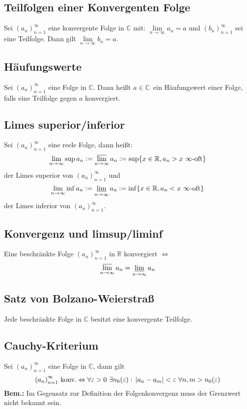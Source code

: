 \documentclass[10pt]{article}
\newcommand{\R}{\mathbb{R}}
\newcommand{\C}{\mathbb{C}}
\newcommand{\an}{{(a_n)}_{n=1}^\infty}
\begin{document}
    \subsection{Teilfolgen einer Konvergenten Folge}
    Sei $\an$ eine konvergente Folge in $\C$ mit:
    $\lim\limits_{n \rightarrow \infty} a_n = a$ und ${(b_n)}_{n=1}^\infty$
    sei eine Teilfolge. Dann gilt $\lim\limits_{n \rightarrow \infty} b_n = a$.

    \subsection{Häufungswerte} Sei $\an$ eine Folge in $\C$. Dann heißt
    $a \in\C$\ ein Häufungswert einer Folge, falls eine Teilfolge gegen $a$ konvergiert.

    \subsection{Limes superior/inferior}
    Sei $\an$ eine reele Folge, dann heißt:
    \begin{equation*}
        \lim_{n \rightarrow \infty} \sup a_n :=
        \varlimsup_{n \rightarrow \infty} a_n :=
        \sup \{ x \in \R, a_n > x\ \infty\text{-oft}\}
    \end{equation*}
    der Limes superior von $\an$ und
    \begin{equation*}
        \lim_{n \rightarrow \infty} \inf a_n :=
        \varliminf_{n \rightarrow \infty} a_n :=
        \inf \{ x \in \R, a_n < x\ \infty\text{-oft}\}
    \end{equation*}
    der Limes inferior von $\an$.

    \subsection{Konvergenz und limsup/liminf}
    Eine beschränkte Folge $\an$ in $\R$ konvergiert $\Leftrightarrow$
    \begin{equation*}
         \varlimsup_{n \rightarrow \infty} a_n
        = \varliminf_{n \rightarrow \infty} a_n
    \end{equation*}

    \subsection{Satz von Bolzano-Weierstraß}
    Jede beschränkte Folge in $\C$ besitzt eine konvergente Teilfolge.

    \subsection{Cauchy-Kriterium}
    Sei $\an$ eine Folge in $\C$, dann gilt
    \begin{equation*}
        \an \text{ konv.} \Leftrightarrow
        \forall \varepsilon > 0\ \exists n_0(\varepsilon):\
        \abs{a_n - a_m} < \varepsilon\ \forall n,m > n_0(\varepsilon)
    \end{equation*}
    \textbf{Bem.:} Im Gegensatz zur Definition der Folgenkonvergenz muss der
    Grenzwert nicht bekannt sein.
\end{document}
